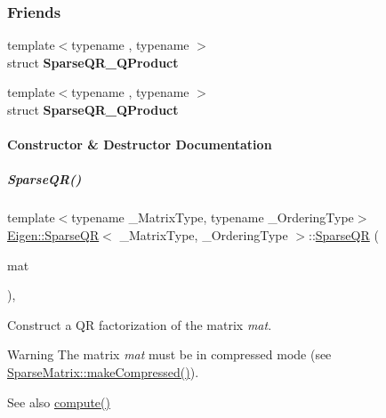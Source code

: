 \subsubsection*{Friends}
\begin{DoxyCompactItemize}
\item 
\mbox{\label{group___sparse_q_r___module_af9b447255bbccd5da503ef3f77798701}} 
{\footnotesize template$<$typename , typename $>$ }\\struct {\bfseries Sparse\+Q\+R\+\_\+\+Q\+Product}
\item 
\mbox{\label{group___sparse_q_r___module_ae62cc9d349071422a62e6256fc1acbe0}} 
{\footnotesize template$<$typename , typename $>$ }\\struct {\bfseries Sparse\+Q\+R\+\_\+\+Q\+Product}
\end{DoxyCompactItemize}


\paragraph{Constructor \& Destructor Documentation}
\mbox{\label{group___sparse_q_r___module_ac50f705d686d4bc687ce6acbc76447d2}} 
\subparagraph{\texorpdfstring{Sparse\+Q\+R()}{SparseQR()}\hspace{0.1cm}{\footnotesize\ttfamily [1/2]}}
{\footnotesize\ttfamily template$<$typename \+\_\+\+Matrix\+Type, typename \+\_\+\+Ordering\+Type$>$ \\
\hyperlink{group___sparse_q_r___module_class_eigen_1_1_sparse_q_r}{Eigen\+::\+Sparse\+QR}$<$ \+\_\+\+Matrix\+Type, \+\_\+\+Ordering\+Type $>$\+::\hyperlink{group___sparse_q_r___module_class_eigen_1_1_sparse_q_r}{Sparse\+QR} (\begin{DoxyParamCaption}\item[{const Matrix\+Type \&}]{mat }\end{DoxyParamCaption})\hspace{0.3cm}{\ttfamily [inline]}, {\ttfamily [explicit]}}

Construct a QR factorization of the matrix {\itshape mat}.

\begin{DoxyWarning}{Warning}
The matrix {\itshape mat} must be in compressed mode (see \hyperlink{group___sparse_core___module_a5ff54ffc10296f9466dc81fa888733fd}{Sparse\+Matrix\+::make\+Compressed()}).
\end{DoxyWarning}
\begin{DoxySeeAlso}{See also}
\hyperlink{group___sparse_q_r___module_aedaf52b7543de4d55c58c8f830c2aeb7}{compute()} 
\end{DoxySeeAlso}


